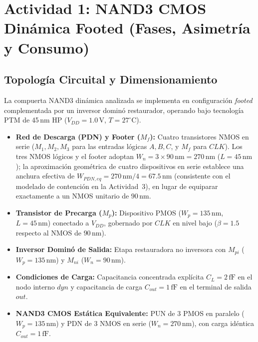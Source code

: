 \section{Actividad 1: NAND3 CMOS Dinámica Footed (Fases, Asimetría y Consumo)}
\label{sec:actividad1}

\subsection{Topología Circuital y Dimensionamiento}
La compuerta NAND3 dinámica analizada se implementa en configuración \textit{footed} complementada por un inversor dominó restaurador, operando bajo tecnología PTM de 45\,nm HP ($V_{DD} = 1.0\,\text{V}$, $T = 27^\circ\text{C}$). 

\begin{itemize}[leftmargin=1.4em,itemsep=0.15em]
  \item \textbf{Red de Descarga (PDN) y Footer ($M_f$):} Cuatro transistores NMOS en serie ($M_1, M_2, M_3$ para las entradas lógicas $A, B, C$, y $M_f$ para $CLK$). Los tres NMOS lógicos y el footer adoptan $W_n = 3 \times 90\,\text{nm} = 270\,\text{nm}$ ($L = 45\,\text{nm}$); la aproximación geométrica de cuatro dispositivos en serie establece una anchura efectiva de $W_{PDN,eq} = 270\,\text{nm}/4 = 67.5\,\text{nm}$ (consistente con el modelado de contención en la Actividad~3), en lugar de equiparar exactamente a un NMOS unitario de $90\,\text{nm}$.
  \item \textbf{Transistor de Precarga ($M_p$):} Dispositivo PMOS ($W_p = 135\,\text{nm}$, $L = 45\,\text{nm}$) conectado a $V_{DD}$, gobernado por $CLK$ en nivel bajo ($\beta = 1.5$ respecto al NMOS de $90\,\text{nm}$).
  \item \textbf{Inversor Dominó de Salida:} Etapa restauradora no inversora con $M_{pi}$ ($W_p = 135\,\text{nm}$) y $M_{ni}$ ($W_n = 90\,\text{nm}$).
  \item \textbf{Condiciones de Carga:} Capacitancia concentrada explícita $C_L = 2\,\text{fF}$ en el nodo interno $dyn$ y capacitancia de carga $C_{out} = 1\,\text{fF}$ en el terminal de salida $out$.
  \item \textbf{NAND3 CMOS Estática Equivalente:} PUN de 3 PMOS en paralelo ($W_p = 135\,\text{nm}$) y PDN de 3 NMOS en serie ($W_n = 270\,\text{nm}$), con carga idéntica $C_{out} = 1\,\text{fF}$.
\end{itemize}

